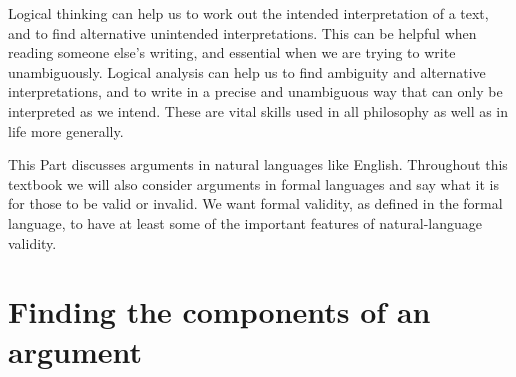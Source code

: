 Logical thinking can help us to work out the intended
interpretation of a text, and to find alternative
unintended interpretations.
This can be helpful when reading someone else’s
writing, and essential when we are trying to write
unambiguously.
Logical analysis can help us to find ambiguity and
alternative interpretations, and to write in a precise and
unambiguous way that can only be interpreted as we
intend.
These are vital skills used in all philosophy as well as in life more generally. 





This Part discusses arguments in natural languages like English. Throughout this textbook we will also consider arguments in formal languages and say what it is for those to be valid or invalid. We want formal validity, as defined in the formal language, to have at least some of the important features of natural-language validity. 





\section{Finding the components of an argument} 



